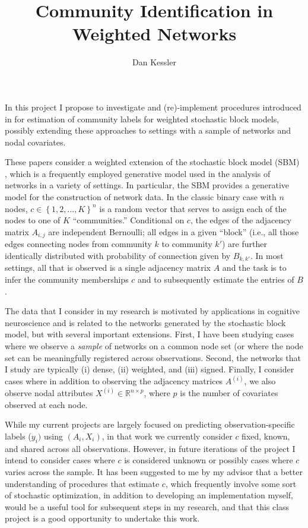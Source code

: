 \documentclass[12pt]{article}   %
\begin{document}


\title{Community Identification in Weighted Networks}
\author{Dan Kessler}

\maketitle


In this project I propose to investigate and (re)-implement procedures introduced in \cite{aicher_adapting_2013,aicher_learning_2015} for estimation of community labels for weighted stochastic block models, possibly extending these approaches to settings with a sample of networks and nodal covariates.

These papers consider a weighted extension of the stochastic block model (SBM) \cite{holland_stochastic_1983}, which is a frequently employed generative model used in the analysis of networks in a variety of settings.
In particular, the SBM provides a generative model for the construction of network data.
In the classic binary case with $n$ nodes, $c \in \left\{ 1, 2, \ldots, K \right\}^n$ is a random vector that serves to assign each of the nodes to one of $K$ ``communities.''
Conditional on $c$, the edges of the adjacency matrix $A_{i,j}$ are independent Bernoulli; all edges in a given ``block'' (i.e., all those edges connecting nodes from community $k$ to community $k'$) are further identically distributed with probability of connection given by $B_{k,k'}$.
In most settings, all that is observed is a single adjacency matrix $A$ and the task is to infer the community memberships $c$ and to subsequently estimate the entries of $B$.

The data that I consider in my research  is motivated by applications in cognitive neuroscience and is related to the networks generated by the stochastic block model, but with several important extensions.
First, I have been studying cases where we observe a \emph{sample} of networks on a common node set (or where the node set can be meaningfully registered across observations.
Second, the networks that I study are typically (i) dense, (ii) weighted, and (iii) signed.
Finally, I consider cases where in addition to observing the adjacency matrices $A^{(i)}$, we also observe nodal attributes $X^{(i)} \in \mathbb{R}^{n \times p}$, where $p$ is the number of covariates observed at each node.

While my current projects are largely focused on predicting observation-specific labels ($y_i)$ using $(A_i,X_i)$, in that work we currently consider $c$ fixed, known, and shared across all observations.
However, in future iterations of the project I intend to consider cases where $c$ is considered unknown or possibly cases where $c$ varies across the sample.
It has been suggested to me by my advisor that a better understanding of procedures that estimate $c$, which frequently involve some sort of stochastic optimization, in addition to developing an implementation myself, would be a useful tool for subsequent steps in my research, and that this class project is a good opportunity to undertake this work.
\end{document}
